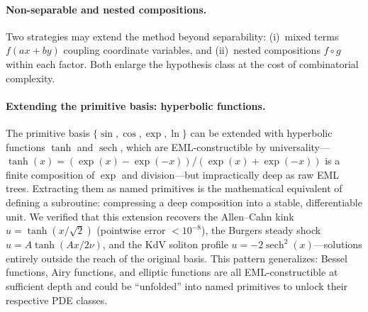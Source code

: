 \paragraph{Non-separable and nested compositions.}
Two strategies may extend the method beyond separability: (i)~mixed terms
$f(ax + by)$ coupling coordinate variables, and (ii)~nested compositions
$f \circ g$ within each factor.  Both enlarge the hypothesis class at the cost
of combinatorial complexity.

\paragraph{Extending the primitive basis: hyperbolic functions.}
The primitive basis $\{\sin, \cos, \exp, \ln\}$ can be extended with hyperbolic
functions $\tanh$ and $\operatorname{sech}$, which are EML-constructible by
universality---$\tanh(x) = (\exp(x) - \exp(-x))/(\exp(x) + \exp(-x))$ is a
finite composition of $\exp$ and division---but impractically deep as raw EML
trees.  Extracting them as named primitives is the mathematical equivalent of
defining a subroutine: compressing a deep composition into a stable,
differentiable unit.  We verified that this extension recovers the Allen--Cahn
kink $u = \tanh(x/\sqrt{2})$ (pointwise error $< 10^{-8}$), the Burgers steady
shock $u = A\tanh(Ax/2\nu)$, and the KdV soliton profile $u = -2\operatorname{sech}^{2}(x)$---solutions
entirely outside the reach of the original basis.  This pattern generalizes:
Bessel functions, Airy functions, and elliptic functions are all
EML-constructible at sufficient depth and could be ``unfolded'' into named
primitives to unlock their respective PDE classes.

